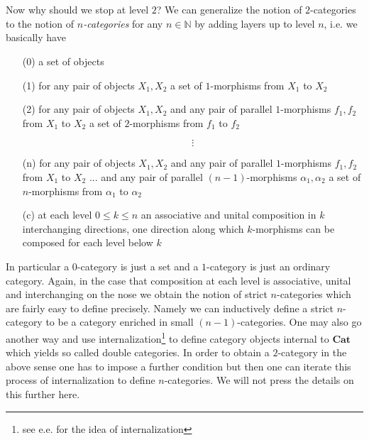 \\\\
Now why should we stop at level $2$? We can generalize the notion of $2$-categories to the notion of \textit{$n$-categories} for any $n \in \mathbb{N}$ by adding layers up to level $n$, i.e. we basically have
\begin{enumerate}
\item[(0)]
a set of objects

\item[(1)]
for any pair of objects $X_{1},X_{2}$ a set of $1$-morphisms from $X_{1}$ to $X_{2}$

\item[(2)]
for any pair of objects $X_{1},X_{2}$ and any pair of parallel $1$-morphisms $f_{1},f_{2}$ from $X_{1}$ to $X_{2}$ a set of $2$-morphisms from $f_{1}$ to $f_{2}$

\item[]
\begin{equation*}
\vdots
\end{equation*}
\item[]

\item[(n)]
for any pair of objects $X_{1},X_{2}$ and any pair of parallel $1$-morphisms $f_{1},f_{2}$ from $X_{1}$ to $X_{2}$ ... and any pair of parallel $(n-1)$-morphisms $\alpha_{1},\alpha_{2}$ a set of $n$-morphisms from $\alpha_{1}$ to $\alpha_{2}$

\item[(c)]
at each level $0 \leq k \leq n$ an associative and unital composition in $k$ interchanging directions, one direction along which $k$-morphisms can be composed for each level below $k$
\end{enumerate}
In particular a $0$-category is just a set and a $1$-category is just an ordinary category. Again, in the case that composition at each level is associative, unital and interchanging on the nose we obtain the notion of strict $n$-categories which are fairly easy to define precisely. Namely we can inductively define a strict $n$-category to be a category enriched in small $(n-1)$-categories. One may also go another way and use internalization\footnote{see e.e. \cite{00000001} for the idea of internalization} to define category objects internal to $\mathbf{Cat}$ which yields so called double categories. In order to obtain a $2$-category in the above sense one has to impose a further condition but then one can iterate this process of internalization to define $n$-categories. We will not press the details on this further here.
